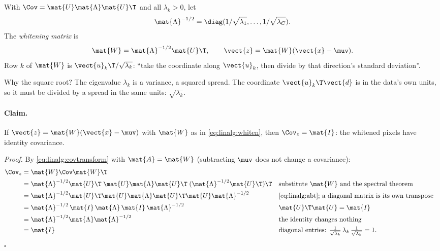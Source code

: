 \begin{definition}
With $\Cov = \mat{U}\mat{\Lambda}\mat{U}\T$ and all $\lambda_k > 0$, let
\[
\mat{\Lambda}^{-1/2} = \diag(1/\sqrt{\lambda_1}, \dots, 1/\sqrt{\lambda_C}).
\]
The \emph{whitening matrix} is
\begin{equation}\label{eq:linalg:whiten}
\mat{W} = \mat{\Lambda}^{-1/2}\mat{U}\T ,
\qquad
\vect{z} = \mat{W}(\vect{x} - \muv).
\end{equation}
Row $k$ of $\mat{W}$ is $\vect{u}_k\T/\sqrt{\lambda_k}$: ``take the coordinate along
$\vect{u}_k$, then divide by that direction's standard deviation''.
\end{definition}

Why the square root? The eigenvalue $\lambda_k$ is a variance, a squared spread. The coordinate
$\vect{u}_k\T\vect{d}$ is in the data's own units, so it must be divided by a spread in the same
units: $\sqrt{\lambda_k}$.

\paragraph{Claim.} If $\vect{z} = \mat{W}(\vect{x} - \muv)$ with $\mat{W}$ as in
\cref{eq:linalg:whiten}, then $\Cov_z = \mat{I}$: the whitened pixels have identity covariance.

\noindent\textit{Proof.} By \cref{eq:linalg:covtransform} with $\mat{A} = \mat{W}$ (subtracting
$\muv$ does not change a covariance):
\begin{align*}
\Cov_z &= \mat{W}\Cov\mat{W}\T\\
&= \mat{\Lambda}^{-1/2}\mat{U}\T\;\mat{U}\mat{\Lambda}\mat{U}\T\;
   (\mat{\Lambda}^{-1/2}\mat{U}\T)\T
  && \text{substitute $\mat{W}$ and the spectral theorem}\\
&= \mat{\Lambda}^{-1/2}\mat{U}\T\mat{U}\mat{\Lambda}\mat{U}\T\mat{U}\mat{\Lambda}^{-1/2}
  && \text{\cref{eq:linalg:abt}; a diagonal matrix is its own transpose}\\
&= \mat{\Lambda}^{-1/2}\,\mat{I}\,\mat{\Lambda}\,\mat{I}\,\mat{\Lambda}^{-1/2}
  && \mat{U}\T\mat{U} = \mat{I}\\
&= \mat{\Lambda}^{-1/2}\mat{\Lambda}\mat{\Lambda}^{-1/2}
  && \text{the identity changes nothing}\\
&= \mat{I}
  && \text{diagonal entries: } \tfrac{1}{\sqrt{\lambda_k}}\,\lambda_k\,\tfrac{1}{\sqrt{\lambda_k}} = 1 .
\end{align*}
\hfill$\square$

